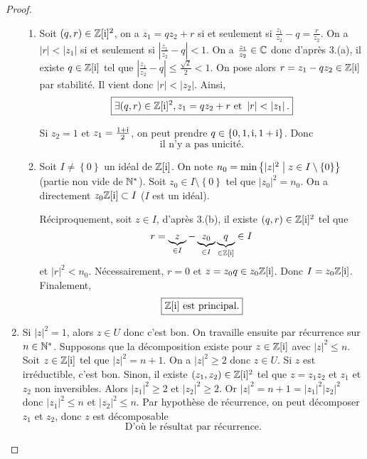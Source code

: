 \documentclass[12pt]{article}
\begin{document}
\begin{proof}
\begin{enumerate}
\begin{enumerate}
			\item Soit $(q,r)\in\mathbb{Z}[\mathrm{i}]^{2}$, on a $z_{1}=qz_{2}+r$ si et seulement si $\frac{z_{1}}{z_{2}}-q=\frac{r}{z_{2}}$. On a $\vert r\vert<\vert z_{1}\vert$ si et seulement si $\left\vert\frac{z_{1}}{z_{2}}-q\right\vert<1$.
			On a $\frac{z_{1}}{z_{2}}\in\mathbb{C}$ donc d'après 3.(a), il existe $q\in\mathbb{Z}[\mathrm{i}]$ tel que $\left\lvert \frac{z_{1}}{z_{2}}-q\right\rvert\leqslant\frac{\sqrt{2}}{2}<1$. On pose alors $r=z_{1}-qz_{2}\in\mathbb{Z}[\mathrm{i}]$ par stabilité. Il vient donc $\vert r\vert<\vert z_{2}\vert$. Ainsi,
			\begin{equation}
				\boxed{\exists(q,r)\in\mathbb{Z}[\mathrm{i}]^{2},z_{1}=qz_{2}+r\text{ et }\left\lvert r\right\rvert<\left\lvert z_{1}\right\rvert.}
			\end{equation}

			Si $z_{2}=1$ et $z_{1}=\frac{1+\mathrm{i}}{2}$, on peut prendre $q\in\left\{0,1,\mathrm{i},1+\mathrm{i}\right\}$.
			Donc 
			\begin{equation}
				\boxed{\text{il n'y a pas unicité.}}
			\end{equation}

			\item Soit $I\neq\left\{0\right\}$ un idéal de $\mathbb{Z}[\mathrm{i}]$. On note $n_{0}=\min\left\{\vert z\vert^{2}\bigm| z\in I\setminus\left\{0\right\}\right\}$ (partie non vide de $\mathbb{N}^{*}$). Soit $z_{0}\in I\setminus\left\{0\right\}$ tel que $\vert z_{0}\vert^{2}=n_{0}$. On a directement $z_{0}\mathbb{Z}[\mathrm{i}]\subset I$ ($I$ est un idéal). 
			
			Réciproquement, soit $z\in I$, d'après 3.(b), il existe $(q,r)\in\mathbb{Z}[\mathrm{i}]^{2}$ tel que 
			\begin{equation}
				r=\underbrace{z}_{\in I}-\underbrace{z_{0}}_{\in I}\underbrace{q}_{\in\mathbb{Z}[\mathrm{i}]}\in I
			\end{equation} 
			et $\vert r\vert^{2}<n_{0}$. Nécessairement, $r=0$ et $z=z_{0}q\in z_{0}\mathbb{Z}[\mathrm{i}]$. Donc $I=z_{0}\mathbb{Z}[\mathrm{i}]$. Finalement, 
			\begin{equation}
				\boxed{\mathbb{Z}[\mathrm{i}]\text{ est principal.}}
			\end{equation}
		\end{enumerate}

		
		\item Si $\vert z\vert^{2}=1$, alors $z\in U$ donc c'est bon. On travaille ensuite par récurrence sur $n\in\mathbb{N}^{*}$. Supposons que la décomposition existe pour $z\in\mathbb{Z}[\mathrm{i}]$ avec $\vert z\vert^{2}\leqslant n$. Soit $z\in\mathbb{Z}[\mathrm{i}]$ tel que $\vert z\vert^{2}=n+1$. On a $\vert z\vert^{2}\geqslant2$ donc $z\in U$. Si $z$ est irréductible, c'est bon. Sinon, il existe $(z_{1},z_{2})\in\mathbb{Z}[\mathrm{i}]^{2}$ tel que $z=z_{1}z_{2}$ et $z_{1}$ et $z_{2}$ non inversibles. Alors $\vert z_{1}\vert^{2}\geqslant2$ et $\vert z_{2}\vert^{2}\geqslant2$. Or $\vert z\vert^{2}=n+1=\vert z_{1}\vert^{2}\vert z_{2}\vert^{2}$ donc $\vert z_{1}\vert^{2}\leqslant n$ et $\vert z_{2}\vert^{2}\leqslant n$. Par hypothèse de récurrence, on peut décomposer $z_{1}$ et $z_{2}$, donc $z$ est décomposable
		\begin{equation}
			\boxed{\text{D'où le résultat par récurrence.}}
		\end{equation}
			

\end{enumerate}
\end{proof}
\end{document}
